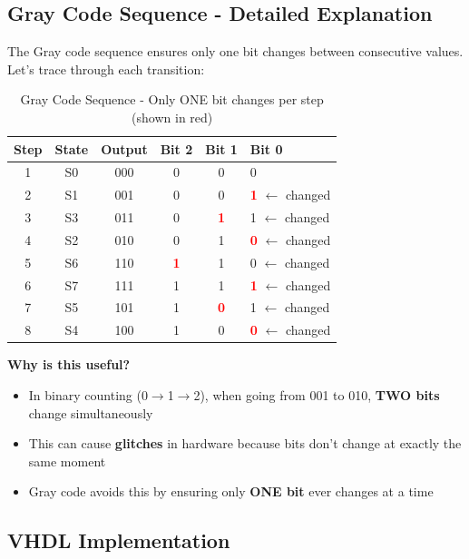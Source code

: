 \documentclass[12pt,a4paper]{article}
\begin{document}
\subsection{Gray Code Sequence - Detailed Explanation}

The Gray code sequence ensures only one bit changes between consecutive values. Let's trace through each transition:

\begin{table}[H]
    \centering
    \begin{tabular}{|c|c|c|c|c|l|}
        \hline
        \textbf{Step} & \textbf{State} & \textbf{Output} & \textbf{Bit 2} & \textbf{Bit 1} & \textbf{Bit 0} \\
        \hline
        1 & S0 & 000 & 0 & 0 & 0 \\
        2 & S1 & 001 & 0 & 0 & \textcolor{red}{\textbf{1}} $\leftarrow$ changed \\
        3 & S3 & 011 & 0 & \textcolor{red}{\textbf{1}} & 1 $\leftarrow$ changed \\
        4 & S2 & 010 & 0 & 1 & \textcolor{red}{\textbf{0}} $\leftarrow$ changed \\
        5 & S6 & 110 & \textcolor{red}{\textbf{1}} & 1 & 0 $\leftarrow$ changed \\
        6 & S7 & 111 & 1 & 1 & \textcolor{red}{\textbf{1}} $\leftarrow$ changed \\
        7 & S5 & 101 & 1 & \textcolor{red}{\textbf{0}} & 1 $\leftarrow$ changed \\
        8 & S4 & 100 & 1 & 0 & \textcolor{red}{\textbf{0}} $\leftarrow$ changed \\
        \hline
    \end{tabular}
    \caption{Gray Code Sequence - Only ONE bit changes per step (shown in red)}
\end{table}

\textbf{Why is this useful?}
\begin{itemize}
    \item In binary counting (0$\rightarrow$1$\rightarrow$2), when going from 001 to 010, \textbf{TWO bits} change simultaneously
    \item This can cause \textbf{glitches} in hardware because bits don't change at exactly the same moment
    \item Gray code avoids this by ensuring only \textbf{ONE bit} ever changes at a time
\end{itemize}

\subsection{VHDL Implementation}
\end{document}
